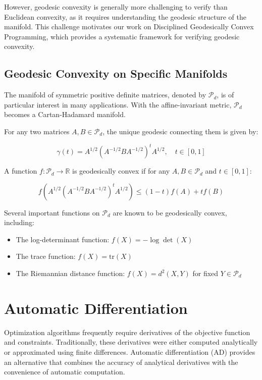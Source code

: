 However, geodesic convexity is generally more challenging to verify than Euclidean convexity, as it requires understanding the geodesic structure of the manifold. This challenge motivates our work on Disciplined Geodesically Convex Programming, which provides a systematic framework for verifying geodesic convexity.

\subsection{Geodesic Convexity on Specific Manifolds}

The manifold of symmetric positive definite matrices, denoted by $\mathcal{P}_d$, is of particular interest in many applications. With the affine-invariant metric, $\mathcal{P}_d$ becomes a Cartan-Hadamard manifold.

For any two matrices $A, B \in \mathcal{P}_d$, the unique geodesic connecting them is given by:

\begin{equation}
\gamma(t) = A^{1/2} \left( A^{-1/2} B A^{-1/2} \right)^t A^{1/2}, \quad t \in [0, 1]
\end{equation}

A function $f: \mathcal{P}_d \rightarrow \mathbb{R}$ is geodesically convex if for any $A, B \in \mathcal{P}_d$ and $t \in [0, 1]$:

\begin{equation}
f\left( A^{1/2} \left( A^{-1/2} B A^{-1/2} \right)^t A^{1/2} \right) \leq (1-t)f(A) + tf(B)
\end{equation}

Several important functions on $\mathcal{P}_d$ are known to be geodesically convex, including:

\begin{itemize}
\item The log-determinant function: $f(X) = -\log \det(X)$
\item The trace function: $f(X) = \text{tr}(X)$
\item The Riemannian distance function: $f(X) = d^2(X, Y)$ for fixed $Y \in \mathcal{P}_d$
\end{itemize}

\section{Automatic Differentiation}

Optimization algorithms frequently require derivatives of the objective function and constraints. Traditionally, these derivatives were either computed analytically or approximated using finite differences. Automatic differentiation (AD) provides an alternative that combines the accuracy of analytical derivatives with the convenience of automatic computation.


